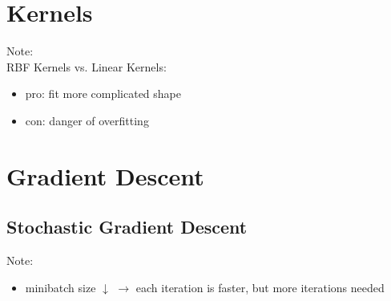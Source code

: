 \documentclass[10pt,landscape,a4paper]{article}
\begin{document}
\begin{multicols*}{5}
\section{Kernels}

Note: \\
RBF Kernels vs. Linear Kernels:
\begin{itemize}
    \item pro: fit more complicated shape
    \item con: danger of overfitting
\end{itemize}

\section{Gradient Descent}

\subsection{Stochastic Gradient Descent}

Note:
\begin{itemize}
    \item minibatch size \(\downarrow \) \(\rightarrow \) each iteration is faster, but more iterations needed
\end{itemize}


\end{multicols*}
\end{document}
